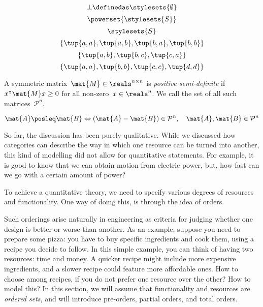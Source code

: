 {\begin{forslides}
\begin{equation*}
\end{equation*}
                \begin{equation*}
        \label{eq:pow_5}
        \bot \definedas \stylesets{\emptyset}
\end{equation*}
\begin{equation*}
        \label{eq:pow_6}
        \powerset{\stylesets{S}}
\end{equation*}
    \begin{equation*}
        \label{eq:pow_7}
        \stylesets{S}
\end{equation*}
    \begin{equation*}
        \label{eq:pre_ex1}
        \{\tup{a,a},\tup{a,b},\tup{b,a},\tup{b,b}\}
\end{equation*}
        \begin{equation*}
        \label{eq:pre_ex2}
        \{\tup{a,b},\tup{b,c},\tup{c,a}\}
\end{equation*}
            \begin{equation*}
        \label{eq:pre_ex3}
        \{\tup{a,a},\tup{b,b},\tup{c,c},\tup{d,d}\}
\end{equation*}
    \begin{definition}
        \label{def:posdef}
        A symmetric matrix~$\mat{M}\in \reals^{n\times n}$ is \emph{positive semi-definite} if~$x^\intercal \mat{M}x\geq 0$ for all non-zero~$x\in \reals^n$. We call the set of all such matrices~$\mathcal{P}^n$.
\end{definition}
    \begin{equation*}
        \label{eq:posdef_1}
        \mat{A}\posleq \mat{B} \Leftrightarrow (\mat{A}-\mat{B})\in \mathcal{P}^n, \quad \mat{A},\mat{B}\in \mathcal{P}^n
\end{equation*}
\end{forslides}
}


So far, the discussion has been purely qualitative. While we discussed how
categories can describe the way in which one resource can be turned into another,
this kind of modelling did not allow for quantitative statements. For example, it
is good to know that we can obtain motion from electric power, but, how fast can
we go with a certain amount of power?

To achieve a quantitative theory, we need to specify various degrees of resources and functionality.
One way of doing this, is through the idea of orders.


Such orderings arise naturally in engineering as criteria for judging whether one design is better or worse than another.
As an example, suppose you need to prepare some pizza: you have to buy specific ingredients and cook them, using a recipe you decide to follow.
In this simple example, you can think of having two resources: time and money.
A quicker recipe might include more expensive ingredients, and a slower recipe could feature more affordable ones.
How to choose among recipes, if you do not prefer one resource over the other? How to model this? In this section, we will assume that functionality and resources
are \emph{ordered sets}, and will introduce pre-orders, partial orders, and total orders.

